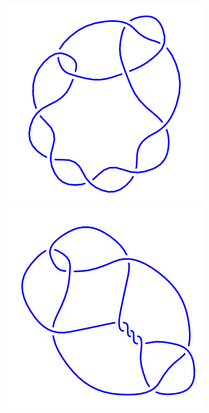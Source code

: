 \begin{figure}[H]
\begin{minipage}[b]{.18\linewidth}
    \end{minipage}
    \begin{minipage}[b]{.18\linewidth}
        \centering
        \includegraphics[width=\linewidth]{../data/10_34.png}
    \end{minipage}
    \begin{minipage}[b]{.18\linewidth}
        \centering
        \includegraphics[width=\linewidth]{../data/10_35.png}

\end{minipage}
\end{figure}
